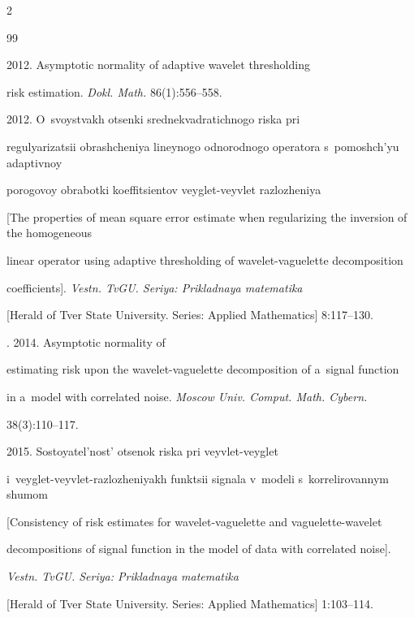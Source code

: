\begin{multicols}{2}
{{\begin{thebibliography}{99}

 2012. Asymptotic normality of adaptive wavelet thresholding 

risk estimation. \textit{Dokl. Math.} 86(1):556--558.




 2012. O~svoystvakh otsenki sred\-ne\-kvad\-ra\-ti\-ch\-no\-go riska pri 

regulyarizatsii obrashcheniya lineynogo odnorodnogo operatora s~pomoshch'yu adaptivnoy 

porogovoy obrabotki koeffitsientov veyglet-veyvlet razlozheniya 

[The properties of mean square error estimate when regularizing the inversion of the homogeneous 

linear operator using adaptive thresholding of wavelet-vaguelette decomposition 

coefficients]. \textit{Vestn. TvGU. Seriya: Prikladnaya matematika} 

[Herald of Tver State University. Series: Applied Mathematics] 8:117--130.




. 2014. Asymptotic normality of 

estimating risk upon the wavelet-vaguelette decomposition of a~signal function 

in a~model with correlated noise. \textit{Moscow Univ. Comput. Math.  Cybern.} 

38(3):110--117.




 2015. Sostoyatel'nost' otsenok riska pri veyvlet-veyglet 

i~veyglet-veyvlet-razlozheniyakh funktsii signala v~modeli s~korrelirovannym shumom 

[Consistency of risk estimates for wavelet-vaguelette and vaguelette-wavelet 

decompositions of signal function in the model of data with correlated noise]. 

\textit{Vestn. TvGU. Seriya: Prikladnaya matematika} 

[Herald of Tver State University. Series: Applied Mathematics] 1:103--114.




\end{thebibliography}}}
\end{multicols}
